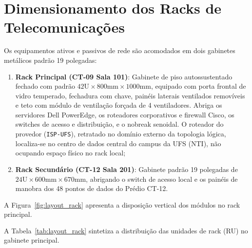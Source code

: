 \section{Dimensionamento dos Racks de Telecomunicações}

Os equipamentos ativos e passivos de rede são acomodados em dois gabinetes metálicos padrão 19 polegadas:
\begin{enumerate}
    \item \textbf{Rack Principal (CT-09 Sala 101)}: Gabinete de piso autossustentado fechado com padrão $42\text{U} \times 800\text{mm} \times 1000\text{mm}$, equipado com porta frontal de vidro temperado, fechadura com chave, painéis laterais ventilados removíveis e teto com módulo de ventilação forçada de 4 ventiladores. Abriga os servidores Dell PowerEdge, os roteadores corporativos e firewall Cisco, os switches de acesso e distribuição, e o nobreak senoidal. O roteador do provedor (\texttt{ISP-UFS}), retratado no domínio externo da topologia lógica, localiza-se no centro de dados central do campus da UFS (NTI), não ocupando espaço físico no rack local;
    \item \textbf{Rack Secundário (CT-12 Sala 201)}: Gabinete padrão 19 polegadas de $24\text{U} \times 600\text{mm} \times 670\text{mm}$, abrigando o switch de acesso local e os painéis de manobra dos 48 pontos de dados do Prédio CT-12.
\end{enumerate}

A Figura~\ref{fig:layout_rack} apresenta a disposição vertical dos módulos no rack principal.


A Tabela~\ref{tab:layout_rack} sintetiza a distribuição das unidades de rack (RU) no gabinete principal.

